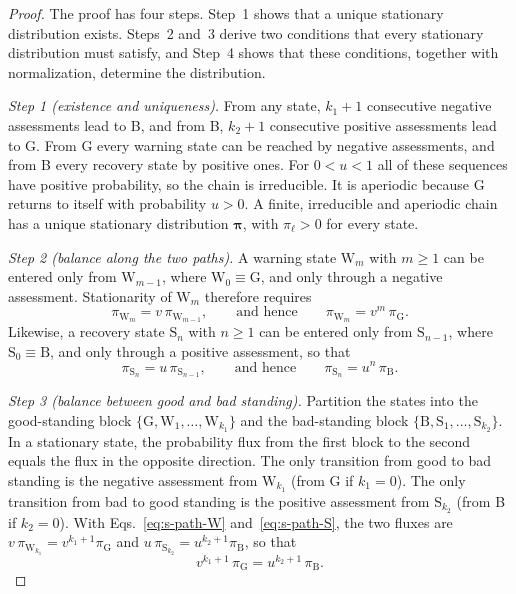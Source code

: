\documentclass[10pt]{wlscirep}
\newcommand{\st}[1]{\mathrm{#1}}           %
\theoremstyle{plain}
\theoremstyle{remark}
\begin{document}
\begin{proof}
The proof has four steps. Step~1 shows that a unique stationary distribution exists. Steps~2 and~3 derive two conditions that every stationary distribution must satisfy, and Step~4 shows that these conditions, together with normalization, determine the distribution.

\textit{Step 1 (existence and uniqueness).} From any state, $k_1+1$ consecutive negative assessments lead to B, and from B, $k_2+1$ consecutive positive assessments lead to G. From G every warning state can be reached by negative assessments, and from B every recovery state by positive ones. For $0<u<1$ all of these sequences have positive probability, so the chain is irreducible. It is aperiodic because G returns to itself with probability $u>0$. A finite, irreducible and aperiodic chain has a unique stationary distribution $\bm\pi$, with $\pi_\ell>0$ for every state.

\textit{Step 2 (balance along the two paths).} A warning state $\st W_m$ with $m\geq1$ can be entered only from $\st W_{m-1}$, where $\st W_0\equiv\st G$, and only through a negative assessment. Stationarity of $\st W_m$ therefore requires
\begin{equation}
\pi_{\st W_m}=v\,\pi_{\st W_{m-1}},
\qquad\text{and hence}\qquad
\pi_{\st W_m}=v^{m}\,\pi_{\st G}.
\label{eq:s-path-W}
\end{equation}
Likewise, a recovery state $\st S_n$ with $n\geq1$ can be entered only from $\st S_{n-1}$, where $\st S_0\equiv\st B$, and only through a positive assessment, so that
\begin{equation}
\pi_{\st S_n}=u\,\pi_{\st S_{n-1}},
\qquad\text{and hence}\qquad
\pi_{\st S_n}=u^{n}\,\pi_{\st B}.
\label{eq:s-path-S}
\end{equation}

\textit{Step 3 (balance between good and bad standing).} Partition the states into the good-standing block $\{\st G,\st W_1,\ldots,\st W_{k_1}\}$ and the bad-standing block $\{\st B,\st S_1,\ldots,\st S_{k_2}\}$. In a stationary state, the probability flux from the first block to the second equals the flux in the opposite direction. The only transition from good to bad standing is the negative assessment from $\st W_{k_1}$ (from G if $k_1=0$). The only transition from bad to good standing is the positive assessment from $\st S_{k_2}$ (from B if $k_2=0$). With Eqs.~\eqref{eq:s-path-W} and~\eqref{eq:s-path-S}, the two fluxes are $v\,\pi_{\st W_{k_1}}=v^{k_1+1}\pi_{\st G}$ and $u\,\pi_{\st S_{k_2}}=u^{k_2+1}\pi_{\st B}$, so that
\begin{equation}
v^{k_1+1}\,\pi_{\st G}=u^{k_2+1}\,\pi_{\st B}.
\label{eq:s-flux}
\end{equation}


\end{proof}
\end{document}

